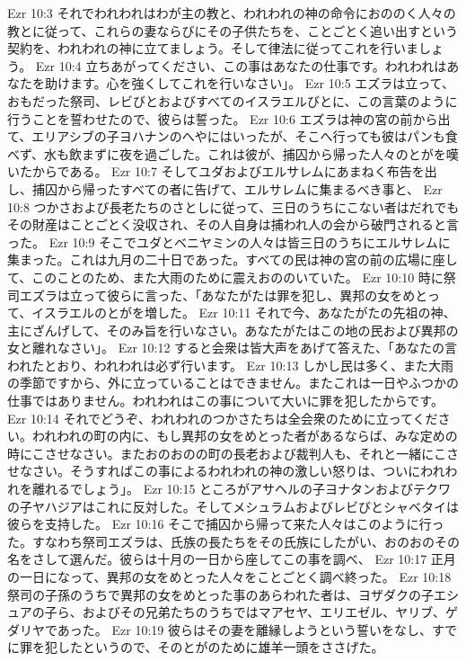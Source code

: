 Ezr 10:3  それでわれわれはわが主の教と、われわれの神の命令におののく人々の教とに従って、これらの妻ならびにその子供たちを、ことごとく追い出すという契約を、われわれの神に立てましょう。そして律法に従ってこれを行いましょう。
Ezr 10:4  立ちあがってください、この事はあなたの仕事です。われわれはあなたを助けます。心を強くしてこれを行いなさい」。
Ezr 10:5  エズラは立って、おもだった祭司、レビびとおよびすべてのイスラエルびとに、この言葉のように行うことを誓わせたので、彼らは誓った。
Ezr 10:6  エズラは神の宮の前から出て、エリアシブの子ヨハナンのへやにはいったが、そこへ行っても彼はパンも食べず、水も飲まずに夜を過ごした。これは彼が、捕囚から帰った人々のとがを嘆いたからである。
Ezr 10:7  そしてユダおよびエルサレムにあまねく布告を出し、捕囚から帰ったすべての者に告げて、エルサレムに集まるべき事と、
Ezr 10:8  つかさおよび長老たちのさとしに従って、三日のうちにこない者はだれでもその財産はことごとく没収され、その人自身は捕われ人の会から破門されると言った。
Ezr 10:9  そこでユダとベニヤミンの人々は皆三日のうちにエルサレムに集まった。これは九月の二十日であった。すべての民は神の宮の前の広場に座して、このことのため、また大雨のために震えおののいていた。
Ezr 10:10  時に祭司エズラは立って彼らに言った、「あなたがたは罪を犯し、異邦の女をめとって、イスラエルのとがを増した。
Ezr 10:11  それで今、あなたがたの先祖の神、主にざんげして、そのみ旨を行いなさい。あなたがたはこの地の民および異邦の女と離れなさい」。
Ezr 10:12  すると会衆は皆大声をあげて答えた、「あなたの言われたとおり、われわれは必ず行います。
Ezr 10:13  しかし民は多く、また大雨の季節ですから、外に立っていることはできません。またこれは一日やふつかの仕事ではありません。われわれはこの事について大いに罪を犯したからです。
Ezr 10:14  それでどうぞ、われわれのつかさたちは全会衆のために立ってください。われわれの町の内に、もし異邦の女をめとった者があるならば、みな定めの時にこさせなさい。またおのおのの町の長老および裁判人も、それと一緒にこさせなさい。そうすればこの事によるわれわれの神の激しい怒りは、ついにわれわれを離れるでしょう」。
Ezr 10:15  ところがアサヘルの子ヨナタンおよびテクワの子ヤハジアはこれに反対した。そしてメシュラムおよびレビびとシャベタイは彼らを支持した。
Ezr 10:16  そこで捕囚から帰って来た人々はこのように行った。すなわち祭司エズラは、氏族の長たちをその氏族にしたがい、おのおのその名をさして選んだ。彼らは十月の一日から座してこの事を調べ、
Ezr 10:17  正月の一日になって、異邦の女をめとった人々をことごとく調べ終った。
Ezr 10:18  祭司の子孫のうちで異邦の女をめとった事のあらわれた者は、ヨザダクの子エシュアの子ら、およびその兄弟たちのうちではマアセヤ、エリエゼル、ヤリブ、ゲダリヤであった。
Ezr 10:19  彼らはその妻を離縁しようという誓いをなし、すでに罪を犯したというので、そのとがのために雄羊一頭をささげた。
